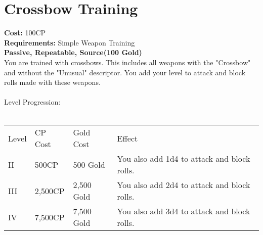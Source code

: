 \section{Crossbow Training}\label{perk:crossbowTraining}
\textbf{Cost:} 100CP\\
\textbf{Requirements:} Simple Weapon Training\\
\textbf{Passive, Repeatable, Source(100 Gold)}\\
You are trained with crossbows.
This includes all weapons with the "Crossbow" and without the "Unusual" descriptor.
You add your level to attack and block rolls made with these weapons.\\
\\
Level Progression:\\
\\
\begin{tabular}{l | l | l | l}
	Level & CP Cost & Gold Cost & Effect\\
	II & 500CP & 500 Gold & You also add 1d4 to attack and block rolls.\\
	III & 2,500CP & 2,500 Gold & You also add 2d4 to attack and block rolls.\\
	IV & 7,500CP & 7,500 Gold & You also add 3d4 to attack and block rolls.\\
\end{tabular}